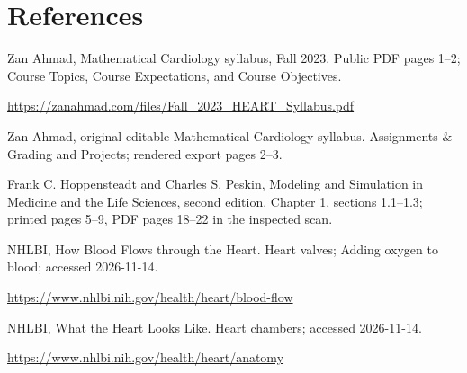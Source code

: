 \documentclass[11pt,letterpaper]{article}
\theoremstyle{definition}\newtheorem{definition}{Definition}\newtheorem{example}{Example}
\numberwithin{equation}{section}
\begin{document}
\section*{References}
\noindent\begin{minipage}{\linewidth}
Zan Ahmad, Mathematical Cardiology syllabus, Fall 2023. Public PDF pages 1--2; Course Topics, Course Expectations, and Course Objectives.

\url{https://zanahmad.com/files/Fall_2023_HEART_Syllabus.pdf}
\end{minipage}\par\medskip
\noindent\begin{minipage}{\linewidth}
Zan Ahmad, original editable Mathematical Cardiology syllabus. Assignments \& Grading and Projects; rendered export pages 2--3.

\end{minipage}\par\medskip
\noindent\begin{minipage}{\linewidth}
Frank C. Hoppensteadt and Charles S. Peskin, Modeling and Simulation in Medicine and the Life Sciences, second edition. Chapter 1, sections 1.1--1.3; printed pages 5--9, PDF pages 18--22 in the inspected scan.

\end{minipage}\par\medskip
\noindent\begin{minipage}{\linewidth}
NHLBI, How Blood Flows through the Heart. Heart valves; Adding oxygen to blood; accessed 2026-11-14.

\url{https://www.nhlbi.nih.gov/health/heart/blood-flow}
\end{minipage}\par\medskip
\noindent\begin{minipage}{\linewidth}
NHLBI, What the Heart Looks Like. Heart chambers; accessed 2026-11-14.

\url{https://www.nhlbi.nih.gov/health/heart/anatomy}
\end{minipage}\par\medskip
\end{document}
